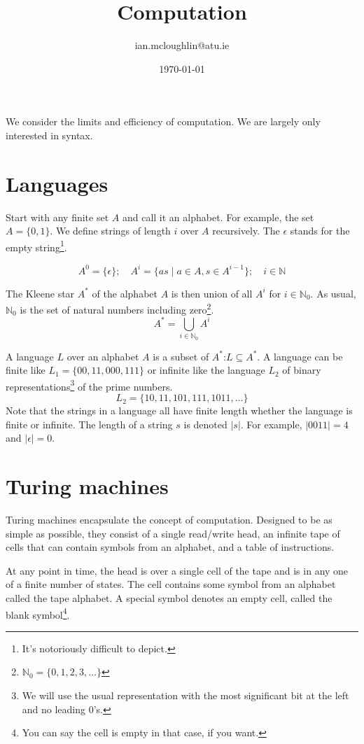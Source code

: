\documentclass{iansnotes}
\title{Computation}
\author{ian.mcloughlin@atu.ie}
\date{\today}
\begin{document}
\maketitle
  We consider the limits and efficiency of computation.
  We are largely only interested in syntax.

\section{Languages}
  Start with any finite set $A$ and call it an alphabet.
  For example, the set $A = \{0, 1\}$.
  We define strings of length $i$ over $A$ recursively.
  The $\epsilon$ stands for the empty string\footnote{It's notoriously difficult to depict.}.

$$ A^0 = \{ \epsilon \}; \quad A^{i} = \{ as \mid a \in A, s \in A^{i-1} \}; \quad i \in \mathbb{N} $$
  
  The Kleene star $A^*$ of the alphabet $A$ is then union of all $A^i$ for $i \in \mathbb{N}_0$.
  As usual, $\mathbb{N}_0$ is the set of natural numbers including zero\footnote{\(\mathbb{N}_0 = \{ 0, 1, 2, 3, \ldots \}\)}.
  \[ A^* = \bigcup_{i \in \mathbb{N}_0} A^i\]

  A language $L$ over an alphabet $A$ is a subset of $A^*$:$L \subseteq A^*$.
  A language can be finite like $L_1 = \{00, 11, 000, 111 \}$ or infinite like the language $L_2$ of binary representations\footnote{We will use the usual representation with the most significant bit at the left and no leading 0's.} of the prime numbers.
  \[ L_2 = \{10, 11, 101, 111, 1011, \ldots \}\]
  Note that the strings in a language all have finite length whether the language is finite or infinite.
  The length of a string $s$ is denoted $|s|$.
  For example, $|0011| = 4$ and $|\epsilon| = 0$.

\section{Turing machines}
  Turing machines encapsulate the concept of computation.
  Designed to be as simple as possible, they consist of a single read/write head, an infinite tape of cells that can contain symbols from an alphabet, and a table of instructions.

  At any point in time, the head is over a single cell of the tape and is in any one of a finite number of states.
  The cell contains some symbol from an alphabet called the tape alphabet.
  A special symbol denotes an empty cell, called the blank symbol\footnote{You can say the cell is empty in that case, if you want.}.
\end{document}
